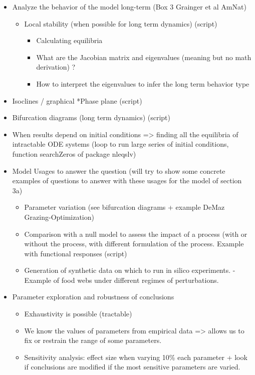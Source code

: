 \documentclass[
]{book}
\providecommand{\tightlist}{%
  \setlength{\itemsep}{0pt}\setlength{\parskip}{0pt}}
\theoremstyle{definition}
\theoremstyle{definition}
\theoremstyle{definition}
\theoremstyle{definition}
\theoremstyle{remark}
\begin{document}
\begin{itemize}
\item
  Analyze the behavior of the model long-term (Box 3 Grainger et al AmNat)

  \begin{itemize}
  \tightlist
  \item
    Local stability (when possible for long term dynamics) (script)

    \begin{itemize}
    \tightlist
    \item
      Calculating equilibria
    \item
      What are the Jacobian matrix and eigenvalues (meaning but no math derivation) ?
    \item
      How to interpret the eigenvalues to infer the long term behavior type
    \end{itemize}
  \end{itemize}
\item
  Isoclines / graphical
  *Phase plane (script)
\item
  Bifurcation diagrams (long term dynamics) (script)
\item
  When results depend on initial conditions =\textgreater{} finding all the equilibria of intractable ODE systems (loop to run large series of initial conditions, function searchZeros of package nleqslv)
\item
  Model Usages to answer the question (will try to show some concrete examples of questions to answer with these usages for the model of section 3a)

  \begin{itemize}
  \tightlist
  \item
    Parameter variation (see bifurcation diagrams + example DeMaz Grazing-Optimization)
  \item
    Comparison with a null model to assess the impact of a process (with or without the process, with different formulation of the process. Example with functional responses (script)
  \item
    Generation of synthetic data on which to run in silico experiments. - Example of food webs under different regimes of perturbations.
  \end{itemize}
\item
  Parameter exploration and robustness of conclusions

  \begin{itemize}
  \tightlist
  \item
    Exhaustivity is possible (tractable)
  \item
    We know the values of parameters from empirical data =\textgreater{} allows us to fix or restrain the range of some parameters.
  \item
    Sensitivity analysis: effect size when varying 10\% each parameter + look if conclusions are modified if the most sensitive parameters are varied.
  \end{itemize}
\end{itemize}
\end{document}
